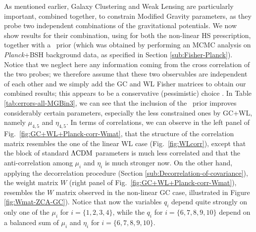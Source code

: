 As mentioned earlier, Galaxy Clustering and Weak Lensing are particularly important, combined together, to constrain Modified Gravity parameters, as they probe two independent combinations of the gravitational potentials. We now show results for their combination, using for both the non-linear HS prescription, together with a \planck\ prior
 (which was obtained by performing an MCMC analysis on {\it Planck}+BSH background data, as specified in Section \ref{sub:Fisher-Planck}). Notice that we neglect here any
 information coming from the cross correlation of the two probes; we therefore assume that these two observables are independent of each other
and we simply add the GC and WL Fisher matrices to obtain our combined results; this appears to be a conservative (pessimistic) choice 
\cite{Lacasa2016}.
 In Table \ref{tab:errors-all-MGBin3}, we can see that the inclusion of the \planck\ prior improves considerably certain parameters, especially
 the less constrained ones by GC+WL, namely $\mu_{4,5}$ and $\eta_{4,5}$.
 In terms of correlations, we can observe in the left panel of Fig.\ \ref{fig:GC+WL+Planck-corr-Wmat}, that the structure of the correlation matrix resembles the one of the linear WL case (Fig.\ \ref{fig:WLcorr}), except that the block of standard $\Lambda\mathrm{CDM}$ parameters is much less correlated and that the anti-correlation among $\mu_i$ and $\eta_i$ is much stronger now.
On the other hand, applying the decorrelation procedure (Section \ref{sub:Decorrelation-of-covariance}), the weight matrix $W$ (right panel of Fig.\ \ref{fig:GC+WL+Planck-corr-Wmat}), resembles the $W$ matrix observed in the non-linear GC case, illustrated in Figure \ref{fig:Wmat-ZCA-GC}). Notice that now the variables $q_i$ depend quite strongly on only one of the $\mu_i$ for $i=\{1,2,3,4\}$, while the $q_i$ for $i=\{6,7,8,9,10\}$ depend on a balanced sum of $\mu_i$ and $\eta_i$ for $i=\{6,7,8,9,10\}$.

